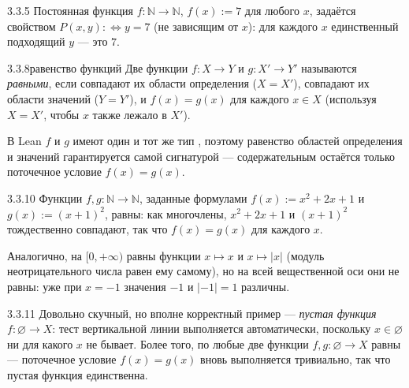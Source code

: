 \begin{example}{3.3.5}{}
Постоянная функция $f:\mathbb{N}\to\mathbb{N}$, $f(x):=7$ для любого $x$, задаётся свойством
$P(x,y):\iff y=7$ (не зависящим от $x$): для каждого $x$ единственный подходящий $y$ — это $7$.
\end{example}

\begin{definition}{3.3.8}{равенство функций}
Две функции $f:X\to Y$ и $g:X'\to Y'$ называются \emph{равными}, если совпадают их области
определения ($X=X'$), совпадают их области значений ($Y=Y'$), и $f(x)=g(x)$ для каждого
$x\in X$ (используя $X=X'$, чтобы $x$ также лежало в $X'$).
\end{definition}

\begin{remark}
В Lean $f$ и $g$ имеют один и тот же тип , поэтому равенство областей
определения и значений гарантируется самой сигнатурой — содержательным остаётся только
поточечное условие $f(x)=g(x)$.
\end{remark}

\begin{example}{3.3.10}{}
Функции $f,g:\mathbb{N}\to\mathbb{N}$, заданные формулами $f(x):=x^2+2x+1$ и $g(x):=(x+1)^2$,
равны: как многочлены, $x^2+2x+1$ и $(x+1)^2$ тождественно совпадают, так что $f(x)=g(x)$
для каждого $x$.

Аналогично, на $[0,+\infty)$ равны функции $x\mapsto x$ и $x\mapsto|x|$ (модуль
неотрицательного числа равен ему самому), но на всей вещественной оси они не равны: уже при
$x=-1$ значения $-1$ и $|-1|=1$ различны.
\end{example}

\begin{example}{3.3.11}{}
Довольно скучный, но вполне корректный пример — \emph{пустая функция} $f:\varnothing\to X$: тест
вертикальной линии выполняется автоматически, поскольку $x\in\varnothing$ ни для какого $x$ не
бывает. Более того, по  любые две функции
$f,g:\varnothing\to X$ равны — поточечное условие $f(x)=g(x)$ вновь выполняется тривиально,
так что пустая функция единственна.
\end{example}

